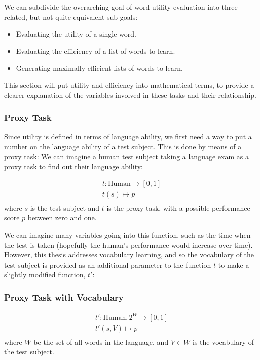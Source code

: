 We can subdivide the overarching goal of word utility evaluation into three related, but not quite equivalent sub-goals:
\begin{itemize}
	\item Evaluating the utility of a single word.
	\item Evaluating the efficiency of a list of words to learn.
	\item Generating maximally efficient lists of words to learn.
\end{itemize}

This section will put utility and efficiency into mathematical terms, to provide a clearer explanation of the variables involved in these tasks and their relationship.

\subsubsection{Proxy Task}
Since utility is defined in terms of language ability, we first need a way to put a number on the language ability of a test subject. This is done by means of a proxy task: We can imagine a human test subject taking a language exam as a proxy task to find out their language ability:

\begin{align*}
	t: \text{Human} \to [0, 1] \\
	t (s) \mapsto p            \\
\end{align*}
where $s$ is the test subject and $t$ is the proxy task, with a possible performance score $p$ between zero and one.

We can imagine many variables going into this function, such as the time when the test is taken (hopefully the human's performance would increase over time). However, this thesis addresses vocabulary learning, and so the vocabulary of the test subject is provided as an additional parameter to the function $t$ to make a slightly modified function, $t'$:

\subsubsection{Proxy Task with Vocabulary}
\begin{align*}
	t': \text{Human}, 2^{W}\to [0, 1] \\
	t' (s, V) \mapsto p               \\
\end{align*}
where $W$ be the set of all words in the language, and $V \in W$ is the vocabulary of the test subject.


